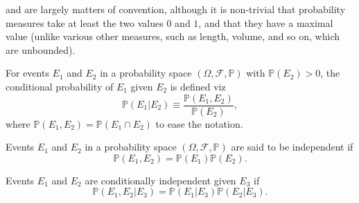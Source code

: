 \begin{remark}
	 and  are largely matters of convention, although it is non-trivial that probability measures take at least the two values $0$ and $1$, and that they have a maximal value (unlike various other measures, such as length, volume, and so on, which are unbounded).
\end{remark}

\begin{definition}
	\label{def:conditional_probability}
	For events $E_1$ and $E_2$ in a probability space $(\Omega, \mathcal{F}, \mathbb{P})$ with $\mathbb{P}(E_2) > 0$, the conditional probability of $E_1$ given $E_2$ is defined viz
	\begin{equation}
		\mathbb{P}(E_1|E_2) \equiv \frac{\mathbb{P}(E_1, E_2)}{\mathbb{P}(E_2)},
		\label{eq:cond}
	\end{equation}
	where $\mathbb{P}(E_1,E_2)= \mathbb{P}(E_1\cap E_2)$ to ease the notation.
\end{definition}
\begin{definition}[Independence]
	\label{def:independence}
	Events $E_1$ and $E_2$  in a probability space $(\Omega, \mathcal{F}, \mathbb{P})$ are said to be independent if
	\begin{equation}
		\mathbb{P}(E_1,E_2) = \mathbb{P}(E_1) \mathbb{P}(E_2).
		\label{eq:ind}
	\end{equation}
\end{definition}

\begin{definition}
\label{def:conditional_independence}
Events $E_1$ and $E_2$ are conditionally independent given $E_3$ if
\begin{equation}
\mathbb{P}(E_1, E_2 | E_3) = \mathbb{P}(E_1|E_3)\mathbb{P}(E_2|E_3).
\end{equation}
\end{definition}


